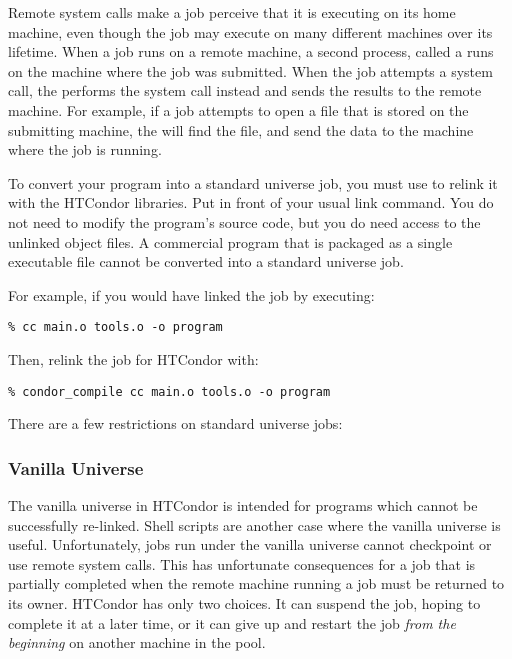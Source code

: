 Remote system calls make a job perceive that it is executing on its home
machine, even though the job may execute on many different machines over its
lifetime.
When a job runs on a remote machine, a second process, called
a  runs on the machine where the job was submitted.
When the job attempts a system call, the  performs
the system call instead and sends the results to the remote
machine.
For example, if a job attempts to open a file that is
stored on the submitting machine,
the  will find the file,
and send the data to the machine where
the job is running.

To convert your program into a standard universe job, you must use
 to relink it with the HTCondor libraries.
Put  in front of your usual link command.
You do not need to modify the program's source code,
but you do need access to the unlinked object files.
A commercial program that is packaged as a single executable file cannot be
converted into a standard universe job.

For example, if you would have linked the job by executing:
\begin{verbatim}
% cc main.o tools.o -o program
\end{verbatim}

Then, relink the job for HTCondor with:
\begin{verbatim}
% condor_compile cc main.o tools.o -o program
\end{verbatim}

There are a few restrictions on standard universe jobs:




\subsubsection{Vanilla Universe}

The vanilla universe in HTCondor is intended
for programs which cannot
be successfully re-linked.
Shell scripts are another case where the vanilla universe
is useful.
Unfortunately, jobs run under the vanilla universe cannot checkpoint or use
remote system calls. 
This has unfortunate consequences for a job that is partially
completed 
when the remote machine running a job must be returned
to its owner.
HTCondor has only two choices.  It can suspend the job, hoping to
complete it at a later time,
or it can give up and restart the job \emph{from the beginning} 
on another machine in the pool.

